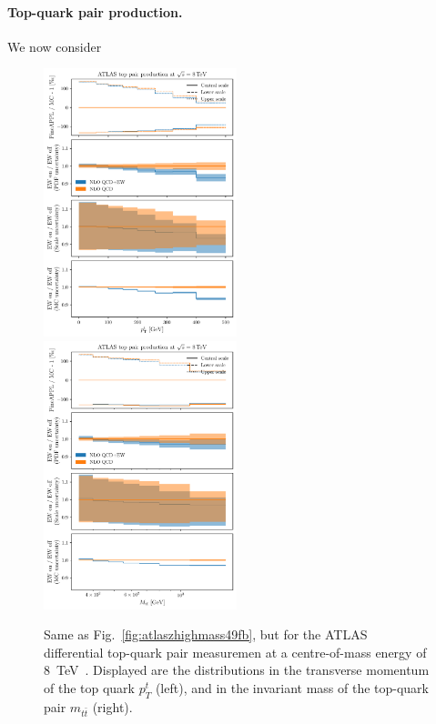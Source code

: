\paragraph{Top-quark pair production.} We now consider 


\begin{figure}[!t]
    \centering
    \includegraphics[width=0.5\textwidth]{figures/pineappl_ATLAS_TTB_DIFF_8TEV_LJ_TPT}%
    \includegraphics[width=0.5\textwidth]{figures/pineappl_ATLAS_TTB_DIFF_8TEV_LJ_TTM}
    \caption{Same as Fig.~\ref{fig:atlaszhighmass49fb}, but for the ATLAS
      differential top-quark pair measuremen at a centre-of-mass energy of
      8~TeV~\cite{Aad:2015mbv}. Displayed are the distributions in the
      transverse momentum of the top quark $p_T^t$ (left), and in the invariant
      mass of the top-quark pair $m_{t\bar{t}}$ (right).}
    \label{fig:atlastop}
\end{figure}



